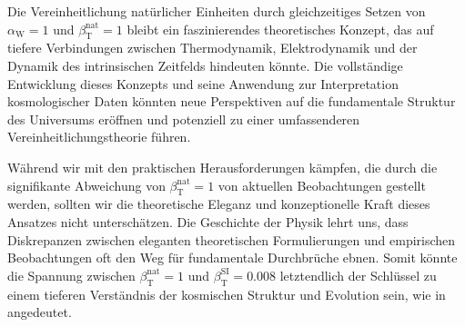 \documentclass[12pt,a4paper]{article}
\newcommand{\betaT}{\beta_{\text{T}}}
\newcommand{\alphaW}{\alpha_{\text{W}}}
\begin{document}
	Die Vereinheitlichung natürlicher Einheiten durch gleichzeitiges Setzen von \(\alphaW = 1\) und \(\betaT^{\text{nat}} = 1\) bleibt ein faszinierendes theoretisches Konzept, das auf tiefere Verbindungen zwischen Thermodynamik, Elektrodynamik und der Dynamik des intrinsischen Zeitfelds hindeuten könnte. Die vollständige Entwicklung dieses Konzepts und seine Anwendung zur Interpretation kosmologischer Daten könnten neue Perspektiven auf die fundamentale Struktur des Universums eröffnen und potenziell zu einer umfassenderen Vereinheitlichungstheorie führen.
	
	Während wir mit den praktischen Herausforderungen kämpfen, die durch die signifikante Abweichung von \(\betaT^{\text{nat}} = 1\) von aktuellen Beobachtungen gestellt werden, sollten wir die theoretische Eleganz und konzeptionelle Kraft dieses Ansatzes nicht unterschätzen. Die Geschichte der Physik lehrt uns, dass Diskrepanzen zwischen eleganten theoretischen Formulierungen und empirischen Beobachtungen oft den Weg für fundamentale Durchbrüche ebnen. Somit könnte die Spannung zwischen \(\betaT^{\text{nat}} = 1\) und \(\betaT^{\text{SI}} = 0.008\) letztendlich der Schlüssel zu einem tieferen Verständnis der kosmischen Struktur und Evolution sein, wie in \cite{pascher_alphabeta_2025} angedeutet.
	
\end{document}
